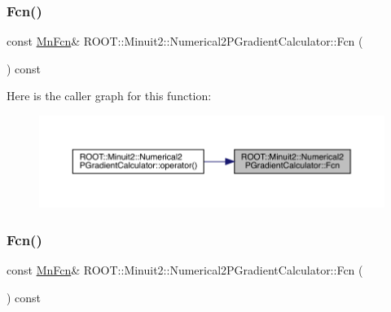 \subsubsection{\texorpdfstring{Fcn()}{Fcn()}\hspace{0.1cm}{\footnotesize\ttfamily [1/3]}}
{\footnotesize\ttfamily const \mbox{\hyperlink{classROOT_1_1Minuit2_1_1MnFcn}{Mn\+Fcn}}\& R\+O\+O\+T\+::\+Minuit2\+::\+Numerical2\+P\+Gradient\+Calculator\+::\+Fcn (\begin{DoxyParamCaption}{ }\end{DoxyParamCaption}) const\hspace{0.3cm}{\ttfamily [inline]}}

Here is the caller graph for this function\+:
\nopagebreak
\begin{figure}[H]
\begin{center}
\leavevmode
\includegraphics[width=350pt]{d0/d82/classROOT_1_1Minuit2_1_1Numerical2PGradientCalculator_a84287ad0b3e0b38769c3ecb00cac1c22_icgraph}
\end{center}
\end{figure}
\mbox{\label{classROOT_1_1Minuit2_1_1Numerical2PGradientCalculator_a84287ad0b3e0b38769c3ecb00cac1c22}} 
\subsubsection{\texorpdfstring{Fcn()}{Fcn()}\hspace{0.1cm}{\footnotesize\ttfamily [2/3]}}
{\footnotesize\ttfamily const \mbox{\hyperlink{classROOT_1_1Minuit2_1_1MnFcn}{Mn\+Fcn}}\& R\+O\+O\+T\+::\+Minuit2\+::\+Numerical2\+P\+Gradient\+Calculator\+::\+Fcn (\begin{DoxyParamCaption}{ }\end{DoxyParamCaption}) const\hspace{0.3cm}{\ttfamily [inline]}}

